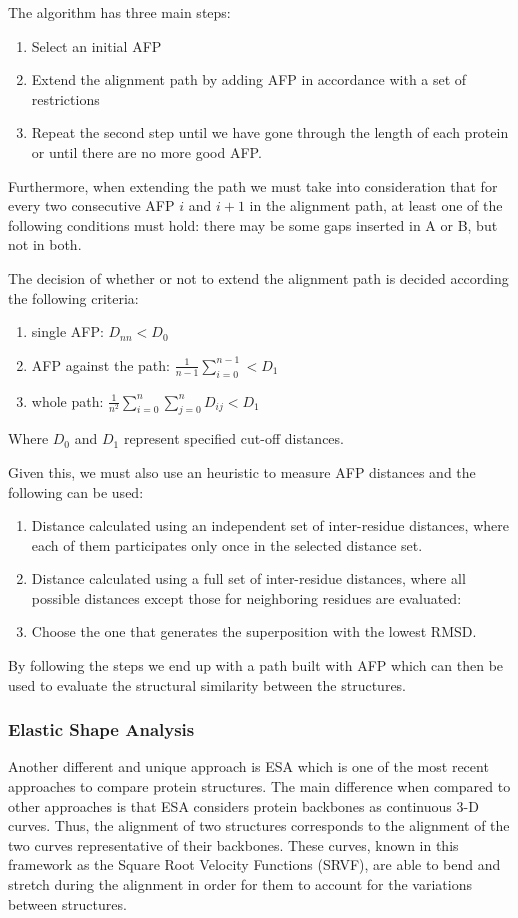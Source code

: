The algorithm has three main steps:
\begin{enumerate}
	\item Select an initial AFP
	\item Extend the alignment path by adding AFP in accordance with a set of restrictions
	\item Repeat the second step until we have gone through the length of each protein or until there are no more good AFP.
\end{enumerate}

Furthermore, when extending the path we must take into consideration that for every two consecutive AFP $i$ and $i+1$ in the alignment path, at least one of the following conditions must hold: there may be some gaps inserted in A or B, but not in both.

The decision of whether or not to extend the alignment path is decided according the following criteria:
\begin{enumerate}
	\item single AFP: $D_{nn} < D_0$
	\item AFP against the path: $\frac{1}{n-1}\sum_{i=0}^{n-1} < D_1$
	\item whole path: $\frac{1}{n^2}\sum_{i=0}^{n}\sum_{j=0}^{n}D_{ij} < D_1$
\end{enumerate}

Where $D_0$ and $D_1$ represent specified cut-off distances.

Given this, we must also use an heuristic to measure AFP distances and the following can be used:
\begin{enumerate}
	\item Distance calculated using an independent set of inter-residue distances, where each of them participates only once in the selected distance set.
	
	\item Distance calculated using a full set of inter-residue distances, where all possible distances except those for neighboring residues are evaluated:
	
	\item Choose the one that generates the superposition with the lowest RMSD.
\end{enumerate}

By following the steps we end up with a path built with AFP which can then be used to evaluate the structural similarity between the structures.

\subsubsection{Elastic Shape Analysis}
Another different and unique approach is ESA \cite{liu2011mathematical} which is one of the most recent approaches to compare protein structures. The main difference when compared to other approaches is that ESA considers protein backbones as continuous 3-D curves. Thus, the alignment of two structures corresponds to the alignment of the two curves representative of their backbones. These curves, known in this framework as the Square Root Velocity Functions (SRVF), are able to bend and stretch during the alignment in order for them to account for the variations between structures.

